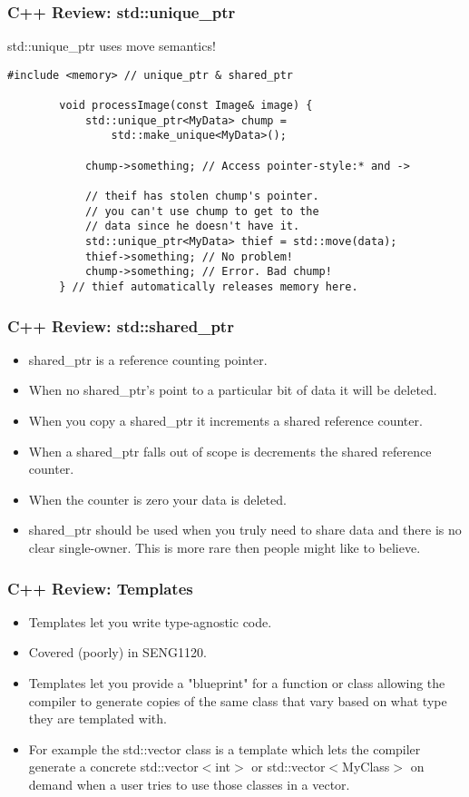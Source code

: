 \documentclass{beamer}
\begin{document}
\begin{frame}[fragile]
	\frametitle{C++ Review: std::unique\_ptr}

	std::unique\_ptr uses move semantics!	

	\begin{lstlisting}[language=nuclear]
		#include <memory> // unique_ptr & shared_ptr

		void processImage(const Image& image) {
			std::unique_ptr<MyData> chump = 
				std::make_unique<MyData>();

			chump->something; // Access pointer-style:* and ->
			
			// theif has stolen chump's pointer.
			// you can't use chump to get to the
			// data since he doesn't have it.
			std::unique_ptr<MyData> thief = std::move(data); 
			thief->something; // No problem!
			chump->something; // Error. Bad chump!
		} // thief automatically releases memory here. 
	\end{lstlisting}
\end{frame}

\begin{frame}[fragile]
	\frametitle{C++ Review: std::shared\_ptr}
	\begin{itemize}
		\item shared\_ptr is a reference counting pointer.
		\item When no shared\_ptr's point to a particular bit of data it will be deleted.
		\item When you copy a shared\_ptr it increments a shared reference counter. 
		\item When a shared\_ptr falls out of scope is decrements the shared reference counter.
		\item When the counter is zero your data is deleted.
		\item shared\_ptr should be used when you truly need to share data and there is no clear single-owner. 
			This is more rare then people might like to believe.
	\end{itemize}
\end{frame}

\begin{frame}
	\frametitle{C++ Review: Templates}
	\begin{itemize}
		\item Templates let you write type-agnostic code.
		\item Covered (poorly) in SENG1120.
		\item Templates let you provide a "blueprint" for a function or class allowing the compiler to generate
			copies of the same class that vary based on what type they are templated with.
		\item For example the std::vector class is a template which lets the compiler generate a concrete
			std::vector$<$int$>$ or std::vector$<$MyClass$>$ on demand when a user tries to use those classes 
			in a vector.
	\end{itemize}
\end{frame}
\end{document}
